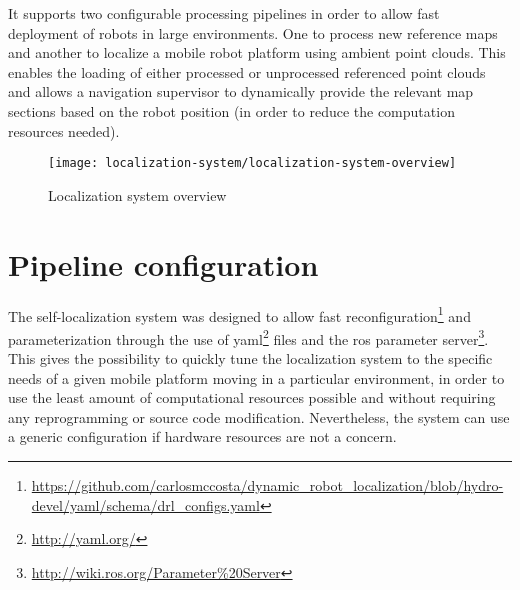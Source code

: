 It supports two configurable processing pipelines in order to allow fast deployment of robots in large environments. One to process new reference maps and another to localize a mobile robot platform using ambient point clouds. This enables the loading of either processed or unprocessed referenced point clouds and allows a navigation supervisor to dynamically provide the relevant map sections based on the robot position (in order to reduce the computation resources needed).


\begin{figure}[H]
	\centering
	\texttt{[image: localization-system/localization-system-overview]}
	\caption{Localization system overview}
	\label{fig:localization-system_localization-system-overview}
\end{figure}



\section{Pipeline configuration}

The self-localization system was designed to allow fast reconfiguration\footnote{\url{https://github.com/carlosmccosta/dynamic_robot_localization/blob/hydro-devel/yaml/schema/drl_configs.yaml}} and parameterization through the use of yaml\footnote{\url{http://yaml.org/}} files and the \gls{ros} parameter server\footnote{\url{http://wiki.ros.org/Parameter\%20Server}}. This gives the possibility to quickly tune the localization system to the specific needs of a given mobile platform moving in a particular environment, in order to use the least amount of computational resources possible and without requiring any reprogramming or source code modification. Nevertheless, the system can use a generic configuration if hardware resources are not a concern.

